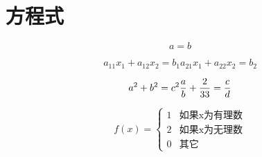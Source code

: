 \documentclass[adobefonts]{ctexbook}
\begin{document}
\section{方程式}
\begin{equation*}
  a=b
\end{equation*}


\begin{equation}
  a_{11} x_1+a_{12}x_2 = b_1
  a_{21}x_1+a_{22}x_2 = b_2
\end{equation}

\begin{equation}
  a^2 + b^2 = c^2\\
  \frac{a}{b}+\frac2{33}=\frac{c}{d}
\end{equation}

\begin{equation} f(x) =
  \begin{cases}
    1 & \text{如果x为有理数} \\
    2 & \text{如果x为无理数} \\
    0 & \text{其它}
  \end{cases}
\end{equation}
\end{document}
